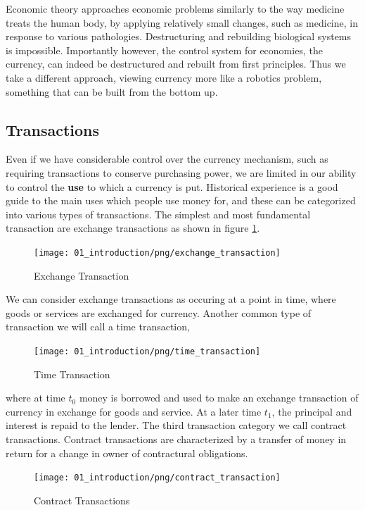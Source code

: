 Economic theory approaches economic problems similarly to the way medicine treats the human body, by
applying relatively small changes, such as medicine, in response to various pathologies.
Destructuring and rebuilding biological systems is impossible. Importantly however, the control
system for economies, the currency, can indeed be destructured and rebuilt from first principles.
Thus we take a different approach, viewing currency more like a robotics problem, something that can
be built from the bottom up.

\subsection{Transactions}

Even if we have considerable control over the currency mechanism, such as requiring transactions to
conserve purchasing power,  we are limited in our ability to control the \textbf{use} to which a
currency is put. Historical experience is a good guide to the main uses which people use money for,
and these can be categorized into various types of transactions. The simplest and most fundamental
transaction are exchange transactions as shown in figure \ref{fig:exchange_transaction1}.

\begin{figure}[H]
\centering
\texttt{[image: 01\_introduction/png/exchange\_transaction]}
\caption{Exchange Transaction}
\label{fig:exchange_transaction1}
\end{figure}

We can consider exchange transactions as occuring at a point in time, where goods or services are
exchanged for currency. Another common type of transaction we will call a time transaction,

\begin{figure}[H]
\centering
\texttt{[image: 01\_introduction/png/time\_transaction]}
\caption{Time Transaction}
\label{fig:time_transaction1}
\end{figure}

where at time $t_0$ money is borrowed and used to make an exchange transaction of currency in
exchange for goods and service. At a later time $t_1$, the principal and interest is repaid to the
lender. The third transaction category we call contract transactions. Contract transactions are
characterized by a transfer of money in return for a change in owner of contractural obligations.

\begin{figure}[H]
\centering
\texttt{[image: 01\_introduction/png/contract\_transaction]}
\caption{Contract Transactions}
\label{fig:contract_transaction1}
\end{figure}


